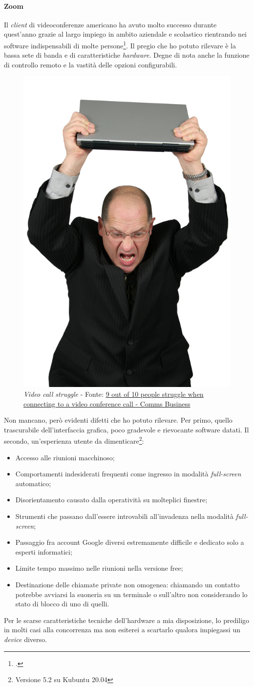 \paragraph{Zoom} Il \textit{client} di videoconferenze americano ha avuto molto successo durante quest'anno grazie al largo impiego in ambito aziendale e scolastico rientrando nei software indispensabili di molte persone\footcite{site:zoomBlog}. Il pregio che ho potuto rilevare è la bassa sete di banda e di caratteristiche \textit{hardware}. Degne di nota anche la funzione di controllo remoto e la vastità delle opzioni configurabili.
\begin{figure}[H]
    \centering
    \includegraphics[width=0.35\columnwidth]{immagini/vc_struggle.jpg}
    \caption{\textit{Video call struggle} - Fonte: \href{https://www.commsbusiness.co.uk/news/9-out-of-10-people-struggle-when-connecting-to-a-video-conference-call/}{9 out of 10 people struggle when connecting to a video conference call - Comms Business}}
    \label{fig:vcStruggle}
\end{figure}
Non mancano, però evidenti difetti che ho potuto rilevare. Per primo, quello trascurabile dell'interfaccia grafica, poco gradevole e rievocante software datati. Il secondo, un'esperienza utente da dimenticare\footnote{Versione 5.2 su Kubuntu 20.04}:
\begin{itemize}
    \item Accesso alle riunioni macchinoso;
    \item Comportamenti indesiderati frequenti come ingresso in modalità \textit{full-screen} automatico;
    \item Disorientamento causato dalla operatività su molteplici finestre;
    \item Strumenti che passano dall'essere introvabili all'invadenza nella modalità \textit{full-screen};
    \item Passaggio fra account Google diversi estremamente difficile e dedicato solo a esperti informatici;
    \item Limite tempo massimo nelle riunioni nella versione free;
    \item Destinazione delle chiamate private non omogenea: chiamando un contatto potrebbe avviarsi la suoneria su un terminale o sull'altro non considerando lo stato di blocco di uno di quelli.
\end{itemize}
Per le scarse caratteristiche tecniche dell'hardware a mia disposizione, lo prediligo in molti casi alla concorrenza ma non esiterei a scartarlo qualora impiegassi un \textit{device} diverso.
